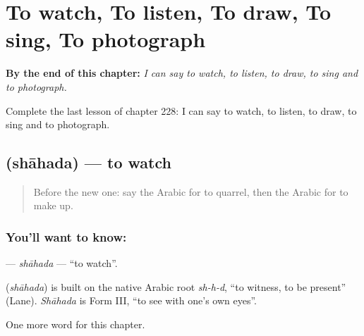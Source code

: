 
\chapter{To watch, To listen, To draw, To sing, To photograph}
\label{ch:ar-to-watch-to-listen-to-draw-to-sing-to-photograph}

\begin{chapteropening}
\textbf{By the end of this chapter:} \emph{I can say to watch, to listen, to draw, to sing and to photograph.}

Complete the last lesson of chapter 228: I can say to watch, to listen, to draw, to sing and to photograph.
\end{chapteropening}

\section[\texorpdfstring{\ar{شاهد} (shāhada)}{شاهد (shāhada)}]{ (shāhada) — to watch}

\label{lesson:AR-C228-shahada}



\begin{quote}
Before the new one: say the Arabic for to quarrel, then the Arabic for to make up.
\end{quote}

\subsection*{You'll want to know: }
\textbf{} — \emph{shāhada} — \textquotedblleft{}to watch\textquotedblright{}.

\begin{cousinweb}
\textbf{} (\emph{shāhada}) is built on the native Arabic root \emph{sh-h-d}, \textquotedblleft{}to witness, to be present\textquotedblright{} (Lane). \emph{Shāhada} is Form III, \textquotedblleft{}to see with one's own eyes\textquotedblright{}.
\end{cousinweb}

\begin{grammarlens}[title={What you've built}]
One more word for this chapter.
\end{grammarlens}

